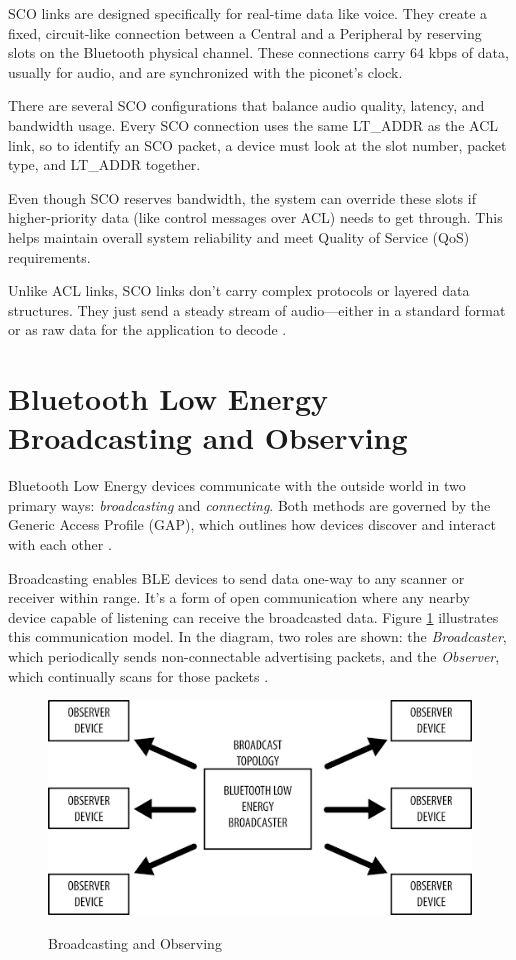 SCO links are designed specifically for real-time data like voice. They create a fixed, circuit-like connection between a Central and a Peripheral by reserving slots on the Bluetooth physical channel. These connections carry 64 kbps of data, usually for audio, and are synchronized with the piconet’s clock.

There are several SCO configurations that balance audio quality, latency, and bandwidth usage. Every SCO connection uses the same LT\_ADDR as the ACL link, so to identify an SCO packet, a device must look at the slot number, packet type, and LT\_ADDR together.

Even though SCO reserves bandwidth, the system can override these slots if higher-priority data (like control messages over ACL) needs to get through. This helps maintain overall system reliability and meet Quality of Service (QoS) requirements.

Unlike ACL links, SCO links don’t carry complex protocols or layered data structures. They just send a steady stream of audio—either in a standard format or as raw data for the application to decode \cite{bluetoothcorespec6}.

\section{Bluetooth Low Energy Broadcasting and Observing}

Bluetooth Low Energy devices communicate with the outside world in two primary ways: \textit{broadcasting} and \textit{connecting}. Both methods are governed by the Generic Access Profile (GAP), which outlines how devices discover and interact with each other \cite{gettingstartedwble}.

Broadcasting enables BLE devices to send data one-way to any scanner or receiver within range. It’s a form of open communication where any nearby device capable of listening can receive the broadcasted data. Figure \ref{fig:broadcastobserve} illustrates this communication model. In the diagram, two roles are shown: the \textit{Broadcaster}, which periodically sends non-connectable advertising packets, and the \textit{Observer}, which continually scans for those packets \cite{gettingstartedwble}.

\begin{figure}[H]
    \caption{Broadcasting and Observing}
    \includegraphics[scale=.8]{broadcastobserve.png}
    \label{fig:broadcastobserve}
    \end{figure}

